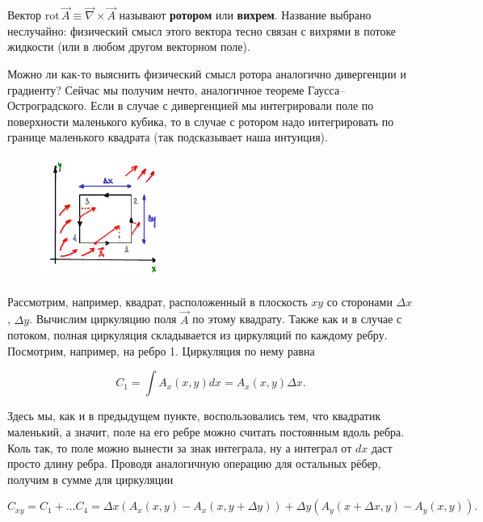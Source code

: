\documentclass[a4paper,12pt]{article}
\numberwithin{equation}{section}
\newcommand{\rot}{\mathrm{rot}\,}
\newcommand{\vn}{\vec{\nabla}}
\begin{document}
Вектор $\rot \vec{A} \equiv \vn \times \vec{A}$ называют
\textbf{ротором} или \textbf{вихрем}. Название выбрано неслучайно:
физический смысл этого вектора тесно связан с вихрями в потоке
жидкости (или в любом другом векторном поле).

Можно ли как-то выяснить физический смысл ротора аналогично
дивергенции и градиенту? Сейчас мы получим нечто, аналогичное теореме
Гаусса--Остроградского. Если в случае с дивергенцией мы интегрировали
поле по поверхности маленького кубика, то в случае с ротором надо
интегрировать по границе маленького квадрата (так подсказывает наша
интуиция).

\begin{figure}
  \begin{center}
    \includegraphics[width=4cm,height=4cm]{stokes.pdf}
  \end{center}
  \label{fig:stokes}
\end{figure}

Рассмотрим, например, квадрат, расположенный в плоскость $xy$ со
сторонами $\Delta x$, $\Delta y$. Вычислим циркуляцию поля $\vec{A}$
по этому квадрату. Также как и в случае с потоком, полная циркуляция
складывается из циркуляций по каждому ребру. Посмотрим, например, на
ребро 1. Циркуляция по нему равна

\begin{equation}
  \label{eq:theorem_curl_1}
  C_1 = \int A_x (x,y) d x = A_x (x,y) \Delta x. 
\end{equation}

Здесь мы, как и в предыдущем пункте, воспользовались тем, что
квадратик маленький, а значит, поле на его ребре можно считать
постоянным вдоль ребра. Коль так, то поле можно вынести за знак
интеграла, ну а интеграл от $dx$ даст просто длину ребра. Проводя
аналогичную операцию для остальных рёбер, получим в сумме для
циркуляции

\begin{equation}
  \label{eq:theorem_curl_2}
  C_{xy} = C_1 + \ldots C_4 = \Delta x
  \left(
    A_x (x,y) - A_x(x,y+\Delta y)
  \right) + \Delta y
  \left(
    A_y (x+\Delta x, y) - A_y (x,y)
  \right).
\end{equation}
\end{document}
